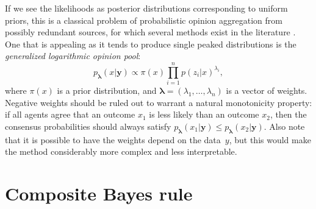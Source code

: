 \documentclass[english]{scrartcl}
\def\y{{\mathbf{y}}}
\newcommand{\blambda}{{\boldsymbol{\lambda}}}
\begin{document}
If we see the likelihoods as posterior distributions corresponding to uniform priors, this is a classical problem of probabilistic opinion aggregation from possibly redundant sources, for which several methods exist in the literature \cite{Tarantola-82,Genest-86,Garg-04,Allard-12}. One that is appealing as it tends to produce single peaked distributions is the {\em generalized logarithmic opinion pool}:
\begin{equation}
\label{eq:log_pool}
p_\blambda(x|\y) \propto \pi(x) \prod_{i=1}^n p(z_i|x)^{\lambda_i},
\end{equation} 
where $\pi(x)$ is a prior distribution, and $\blambda=(\lambda_1,\ldots,\lambda_n)$ is a vector of weights. Negative weights should be ruled out to warrant a natural monotonicity property: if all agents agree that an outcome $x_1$ is less likely than an outcome $x_2$, then the consensus probabilities should always satisfy $p_\blambda(x_1|\y)\leq p_\blambda(x_2|\y)$. Also note that it is possible to have the weights depend on the data~$y$, but this would make the method considerably more complex and less interpretable. 







\section{Composite Bayes rule}
\label{sec:bayes_rule}
\end{document}
